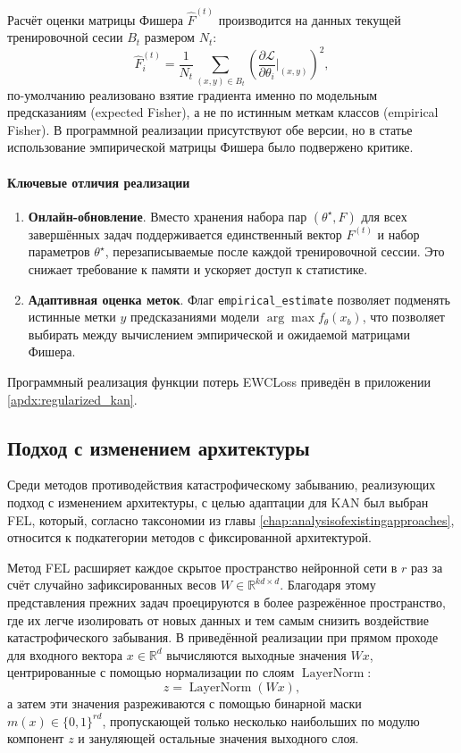 \documentclass[a4paper,14pt]{extarticle}
\begin{document}
Расчёт оценки матрицы Фишера \(\hat F^{(t)}\) производится на данных текущей
тренировочной сесии \(B_t\) размером \(N_t\):
\begin{equation}
    \hat F^{(t)}_i=\frac{1}{N_t}\sum_{(x,y)\in B_t}
        \left(
        \frac{\partial\mathcal{L}}{\partial\theta_i}
        \Big|_{(x,y)}
        \right)^2,
    \label{eq:fisher_batch}
\end{equation}
по-умолчанию реализовано взятие градиента именно по модельным предсказаниям
(expected Fisher), а не по истинным меткам классов (empirical Fisher). В
программной реализации присутствуют обе версии, но в статье 
\cite{kunstner2019limitations} использование эмпирической матрицы Фишера было
подвержено критике.
\paragraph{Ключевые отличия реализации}
\begin{enumerate}
    \item \textbf{Онлайн-обновление}. Вместо хранения набора пар \((\theta^{\star},F)\)
        для всех
        завершённых задач поддерживается единственный вектор \(F^{(t)}\) и
        набор параметров \(\theta^{\star}\), перезаписываемые после каждой
        тренировочной сессии. Это снижает требование к памяти и ускоряет доступ к
        статистике.
    \item \textbf{Адаптивная оценка меток}.  
        Флаг \texttt{empirical\_estimate} позволяет подменять
        истинные метки \(y\) предсказаниями модели
        \(\arg\max f_{\theta}(x_b)\), что
        позволяет выбирать между вычислением эмпирической и ожидаемой
        матрицами Фишера.
\end{enumerate}

Программный реализация функции потерь EWCLoss приведён в
приложении \ref{apdx:regularized_kan}.
\subsection{Подход с изменением архитектуры}
Среди методов противодействия катастрофическому забыванию, реализующих подход с
изменением архитектуры, с целью адаптации для KAN был выбран FEL, который,
согласно таксономии из главы \ref{chap:analysisofexistingapproaches}, относится
к подкатегории методов с фиксированной архитектурой.

Метод FEL расширяет каждое скрытое пространство нейронной сети в \(r\) раз за счёт
случайно зафиксированных весов \(W\!\in\!\mathbb{R}^{kd\times d}\). Благодаря
этому представления прежних задач проецируются в более разрежённое пространство,
где их легче изолировать от новых данных и тем самым снизить воздействие
катастрофического забывания. В приведённой реализации при прямом проходе для
входного вектора \(x\!\in\!\mathbb{R}^{d}\) вычисляются выходные значения
\(Wx\), центрированные с помощью нормализации по слоям \(\operatorname{LayerNorm}\):
\begin{equation}
    z=\operatorname{LayerNorm}(Wx),
\end{equation}
а затем эти значения разреживаются с помощью
бинарной маски \(m(x)\!\in\!\{0,1\}^{rd}\), пропускающей только несколько наибольших по модулю
компонент \(z\) и зануляющей остальные значения выходного слоя.
\end{document}
